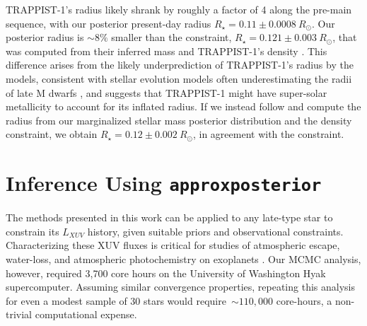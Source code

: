 \documentclass[twocolumn]{aastex62}
\newcommand{\approxposterior}[0]{\texttt{approxposterior}\xspace}
\begin{document}
TRAPPIST-1's radius likely shrank by roughly a factor of 4 along the pre-main sequence, with our posterior present-day radius $R_{\star} = 0.11 \pm{0.0008} \ R_{\odot}$. Our posterior radius is ${\sim} 8\%$ smaller than the \citet{vanGrootel2018} constraint, $R_{\star} = 0.121 \pm {0.003} \ R_{\odot}$, that was computed from their inferred mass and TRAPPIST-1's density \citep{Delrez2018}. This difference arises from the likely underprediction of TRAPPIST-1's radius by the \citet{Baraffe2015} models, consistent with stellar evolution models often underestimating the radii of late M dwarfs \citep{Reid2005,Spada2013,Jackson2019}, and suggests that TRAPPIST-1 might have super-solar metallicity \citep{Burgasser2017,vanGrootel2018} to account for its inflated radius. If we instead follow \citet{vanGrootel2018} and compute the radius from our marginalized stellar mass posterior distribution and the \citet{Delrez2018} density constraint, we obtain $R_{\star} = 0.12 \pm{0.002} \ R_{\odot}$, in agreement with the \citet{vanGrootel2018} constraint.


\section{Inference Using \approxposterior} \label{sec:approx}

The methods presented in this work can be applied to any late-type star to constrain its $L_{XUV}$ history, given suitable priors and observational constraints. Characterizing these XUV fluxes is critical for studies of atmospheric escape, water-loss, and atmospheric photochemistry on exoplanets \citep[e.g.][]{Lammer2003,Ribas2005,MurrayClay2009,Luger2015,Airapetian2019}. Our MCMC analysis, however, required 3,700 core hours on the University of Washington Hyak supercomputer. Assuming similar convergence properties, repeating this analysis for even a modest sample of 30 stars would require~${\sim} 110,000$ core-hours, a non-trivial computational expense. 

\end{document}
